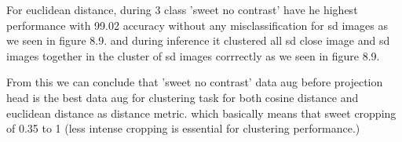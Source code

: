 For euclidean distance, during 3 class 'sweet no contrast' have he highest performance with 99.02 accuracy without any misclassification for sd images as we seen 
in figure 8.9. and during inference it clustered all sd close image and sd images together in the cluster of sd images corrrectly as we seen in figure 8.9.


From this we can conclude that 'sweet no contrast' data aug before projection head is the best data aug for clustering task for both
 cosine distance and euclidean distance as distance metric. which basically means that sweet cropping of 0.35 to 1 (less intense cropping is essential for clustering performance.)



